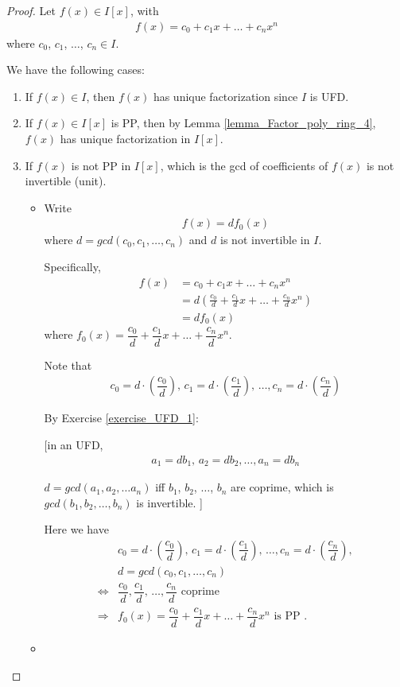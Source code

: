 \documentclass[utf8]{ctexbook}
\begin{document}
\begin{proof}
Let $f(x) \in I[x]$, with
\begin{align*}
f(x) = c_0 + c_1 x + \ldots + c_n x^n
\end{align*}
where $c_0$, $c_1$, $\ldots$, $c_n \in I$.

We have the following cases:
\begin{enumerate}
\item{If $f(x) \in I$, then $f(x)$ has unique factorization since $I$ is UFD.}
\item{If $f(x) \in I[x]$ is PP, then by Lemma \ref{lemma_Factor_poly_ring_4}, $f(x)$ has unique factorization in $I[x]$.}
\item{If $f(x)$ is not PP in $I[x]$, which is the gcd of coefficients of $f(x)$ is not invertible (unit). 

\begin{itemize}
\item{Write
\begin{align*}
f(x) = d f_0 (x)
\end{align*}
where $d = gcd(c_0, c_1, \ldots, c_n)$ and $d$ is not invertible in $I$.

Specifically,
\begin{align*}
f(x) & = c_0 + c_1 x + \ldots + c_n x^n \\
& = d ( \frac{c_0}{d} + \frac{c_1}{d} x + \ldots + \frac{c_n}{d} x^n )\\
& = d f_0 (x)
\end{align*}
where $f_0 (x) = \dfrac{c_0}{d} + \dfrac{c_1}{d} x + \ldots + \dfrac{c_n}{d} x^n $.

Note that
\begin{align*}
c_0 = d \cdot (\dfrac{c_0}{d}), \, c_1 = d \cdot (\dfrac{c_1}{d}), \, \ldots, c_n = d \cdot (\dfrac{c_n}{d})
\end{align*}


By Exercise \ref{exercise_UFD_1}: 

[in an UFD, 
\begin{align*}
a_1 = d b_1, \, a_2 = d b_2, \ldots, a_n = d b_n
\end{align*}

$d = gcd(a_1, a_2, \ldots a_n)$ iff $b_1$, $b_2$, $\ldots$, $b_n$ are coprime, which is $gcd(b_1, b_2, \ldots, b_n)$ is invertible.
]

Here we have
\begin{align*}
& c_0 = d \cdot (\dfrac{c_0}{d}), \, c_1 = d \cdot (\dfrac{c_1}{d}), \, \ldots, c_n = d \cdot (\dfrac{c_n}{d}), \\
& d = gcd(c_0, c_1, \ldots, c_n) \\
\iff &  \dfrac{c_0}{d}, \dfrac{c_1}{d}, \, \ldots, \dfrac{c_n}{d} \mbox{ coprime} \\
\Longrightarrow &  f_0 (x) = \dfrac{c_0}{d} + \dfrac{c_1}{d} x + \ldots + \dfrac{c_n}{d} x^n  \mbox{ is PP .}
\end{align*}
}
\item{

}
\end{itemize}}
\end{enumerate}
\end{proof}
\end{document}
